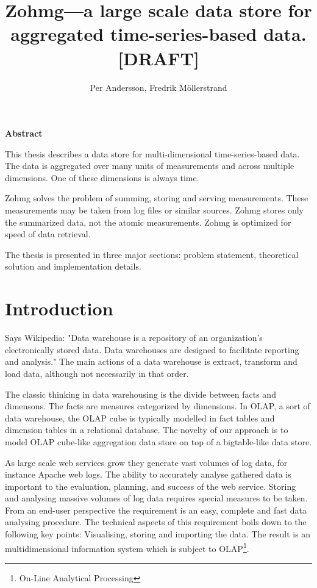 \documentclass[a4paper,10pt]{book}
\author{Per Andersson, Fredrik M{\"o}llerstrand}
\title{Zohmg---a large scale data store for aggregated time-series-based
data. [DRAFT]}
\begin{document}
\maketitle

\noindent \Large{\textbf{Abstract}}
\vspace{12pt}

\noindent 
This thesis describes a data store for multi-dimensional time-series-based data. The data is aggregated over many units of measurements and across multiple dimensions. One of these dimensions is always time.

Zohmg solves the problem of summing, storing and serving measurements. These measurements may be taken from log files or similar sources. Zohmg stores only the summarized data, not the atomic measurements. Zohmg is optimized for speed of data retrieval.

The thesis is presented in three major sections: problem statement, theoretical solution and implementation details.


\tableofcontents
\vfill
\pagebreak

\chapter{Introduction}




Says Wikipedia: "Data warehouse is a repository of an organization's electronically stored data. Data warehouses are designed to facilitate reporting and analysis." The main actions of a data warehouse is extract, transform and load data, although not necessarily in that order.

The classic thinking in data warehousing is the divide between facts and dimensons. The facts are measures categorized by dimensions. In OLAP, a sort of data warehouse, the OLAP cube is typically modelled in fact tables and dimension tables in a relational database. The novelty of our approach is to model OLAP cube-like aggregation data store on top of a bigtable-like data store.


As large scale web services grow they generate vast volumes of log data,
for instance Apache web logs. The ability to accurately analyse gathered
data is important to the evaluation, planning, and success of the web
service. Storing and analysing massive volumes of log data requires
special measures to be taken. From an end-user perspective the requirement
is an easy, complete and fast data analysing procedure. The technical
aspects of this requirement boils down to the following key points:
Visualising, storing and importing the data. The result is an
multidimensional information system which is subject to
OLAP\footnote{On-Line Analytical Processing}. \cite{olap_solutions}
\end{document}
